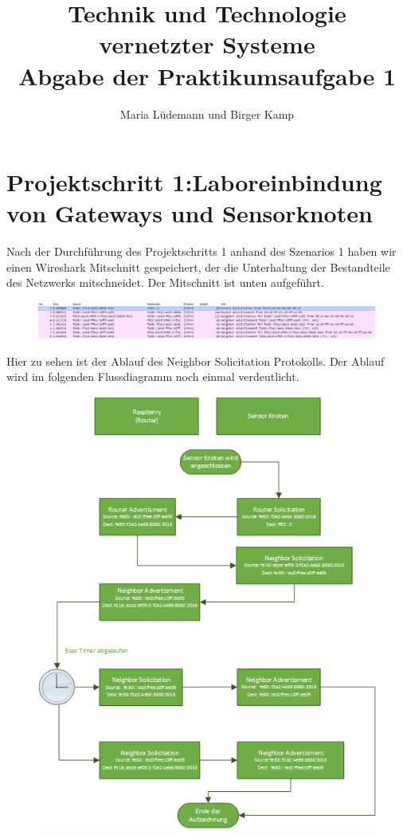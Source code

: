 \documentclass[]{scrartcl}
\title{Technik und Technologie vernetzter Systeme  \\ Abgabe der Praktikumsaufgabe 1}
\author{Maria Lüdemann und Birger Kamp}
\begin{document}
\maketitle

\section{Projektschritt 1:Laboreinbindung von Gateways und Sensorknoten}
Nach der Durchführung des Projektschritts 1 anhand des Szenarios 1 haben wir einen Wireshark Mitschnitt gespeichert, der die Unterhaltung der Bestandteile des Netzwerks mitschneidet. Der Mitschnitt ist unten aufgeführt.

\begin{figure}[H]
	\centering
	\includegraphics[width=1\linewidth]{wireshark_1.png}
	\label{fig:wireshark_1}
\end{figure}

Hier zu sehen ist der Ablauf des Neighbor Solicitation Protokolls. Der Ablauf wird im folgenden Flussdiagramm noch einmal verdeutlicht. 


\begin{figure}[H]
	\centering
	\includegraphics[width=1\linewidth]{flussdiagramm.png}
	\label{fig:flussdiagramm}
\end{figure}
\end{document}
